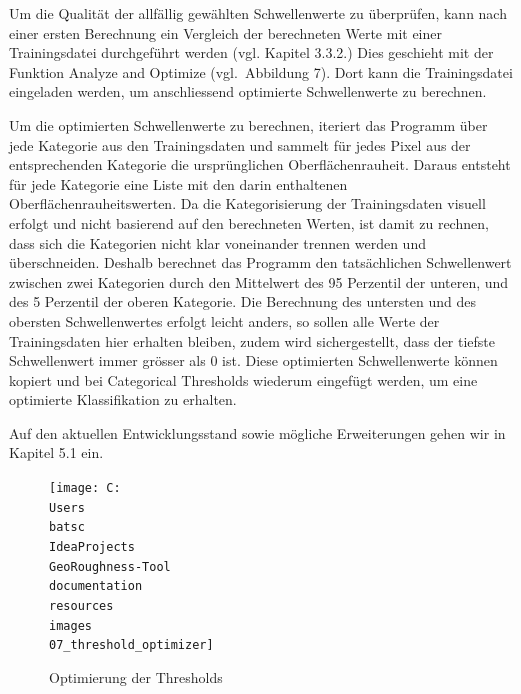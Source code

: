 \documentclass[12pt]{article}
\begin{document}
        Um die Qualität der allfällig gewählten Schwellenwerte zu überprüfen, kann nach einer ersten Berechnung ein Vergleich der berechneten Werte mit einer Trainingsdatei durchgeführt werden (vgl. Kapitel 3.3.2.) %
        Dies geschieht mit der Funktion Analyze and Optimize (vgl.\ Abbildung 7). %
        Dort kann die Trainingsdatei eingeladen werden, um anschliessend optimierte Schwellenwerte zu berechnen.

        Um die optimierten Schwellenwerte zu berechnen, iteriert das Programm über jede Kategorie aus den Trainingsdaten und sammelt für jedes Pixel aus der entsprechenden Kategorie die ursprünglichen Oberflächenrauheit.
        Daraus entsteht für jede Kategorie eine Liste mit den darin enthaltenen Oberflächenrauheitswerten.
        Da die Kategorisierung der Trainingsdaten visuell erfolgt und nicht basierend auf den berechneten Werten, ist damit zu rechnen, dass sich die Kategorien nicht klar voneinander trennen werden und überschneiden.
        Deshalb berechnet das Programm den tatsächlichen Schwellenwert zwischen zwei Kategorien durch den Mittelwert des 95 Perzentil der unteren, und des 5 Perzentil der oberen Kategorie.
        Die Berechnung des untersten und des obersten Schwellenwertes erfolgt leicht anders, so sollen alle Werte der Trainingsdaten hier erhalten bleiben, zudem wird sichergestellt, dass der tiefste Schwellenwert immer grösser als 0 ist.
        Diese optimierten Schwellenwerte können kopiert und bei Categorical Thresholds wiederum eingefügt werden, um eine optimierte Klassifikation zu erhalten.


        Auf den aktuellen Entwicklungsstand sowie mögliche Erweiterungen gehen wir in Kapitel 5.1 ein. %

        \begin{figure}
            \centering
            \texttt{[image: C:\\Users\\batsc\\IdeaProjects\\GeoRoughness-Tool\\documentation\\resources\\images\\07\_threshold\_optimizer]}
            \caption{Optimierung der Thresholds}
            \label{fig:07_threshold_optimizer}
        \end{figure}
\end{document}

